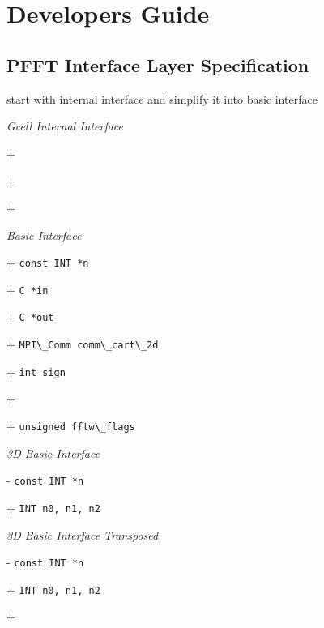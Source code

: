 \chapter{Developers Guide}\label{chap:develop}

\section{PFFT Interface Layer Specification}
\begin{compactitem}
  \myitem start with internal interface and simplify it into basic interface
\end{compactitem}


\emph{Gcell Internal Interface}
\begin{compactitem}
  \item[+] \verb++
  \item[+] \verb++
  \item[+] \verb++
\end{compactitem}




\emph{Basic Interface}
\begin{compactitem}
  \item[+] \verb+const INT *n+
  \item[+] \verb+C *in+
  \item[+] \verb+C *out+
  \item[+] \verb+MPI\_Comm comm\_cart\_2d+
  \item[+] \verb+int sign+
  \item[+] 
  \item[+] \verb+unsigned fftw\_flags+
\end{compactitem}

\emph{3D Basic Interface}
\begin{compactitem}
  \item[-] \verb+const INT *n+
  \item[+] \verb+INT n0, n1, n2+
\end{compactitem}

\emph{3D Basic Interface Transposed}
\begin{compactitem}
  \item[-] \verb+const INT *n+
  \item[+] \verb+INT n0, n1, n2+
  \item[+] 
\end{compactitem}


